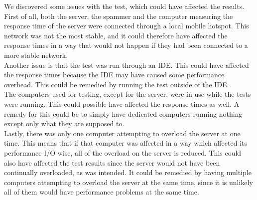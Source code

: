 We discovered some issues with the test, which could have affected the results.\\
First of all, both the server, the spammer and the computer measuring the response time of the server were connected through a local mobile hotspot. This network was not the most stable, and it could therefore have affected the response times in a way that would not happen if they had been connected to a more stable network.\\
Another issue is that the test was run through an IDE. This could have affected the response times because the IDE may have caused some performance overhead. This could be remedied by running the test outside of the IDE.\\
The computers used for testing, except for the server, were in use while the tests were running. This could possible have affected the response times as well. A remedy for this could be to simply have dedicated computers running nothing except only what they are supposed to.\\
Lastly, there was only one computer attempting to overload the server at one time. This means that if that computer was affected in a way which affected its performance I/O wise, all of the overload on the server is reduced. This could also have affected the test results since the server would not have been continually overloaded, as was intended. It could be remedied by having multiple computers attempting to overload the server at the same time, since it is unlikely all of them would have performance problems at the same time.


